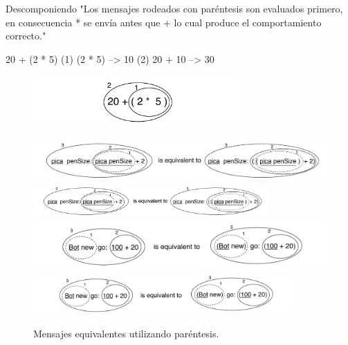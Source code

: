 \documentclass[a4paper,10pt,twoside]{book}
\begin{document}
\begin{example}[mathcorrect]{Descomponiendo }{}
"Los mensajes rodeados con par\'entesis son evaluados primero, en consecuencia * se env\'ia antes que + lo cual produce el comportamiento correcto."

    20 + (2 * 5)
(1)        (2 * 5) --> 10
(2) 20 + 10      --> 30
\end{example}

\begin{figure}
\begin{center}
\includegraphics[width=8cm]{ucompoNumberBracket}
\end{center}
\end{figure}



\begin{figure}
\begin{center}
\ifluluelse
	{\includegraphics[width=\textwidth]{uKeyUnBinPar}}
	{\includegraphics[width=0.8\textwidth]{uKeyUnBinPar}}
\ifluluelse
	{\includegraphics[width=\textwidth]{uunKeyBinPar}}
	{\includegraphics[width=10cm]{uunKeyBinPar}}
\end{center}
\caption{Mensajes equivalentes utilizando paréntesis. }
\end{figure}
\end{document}
